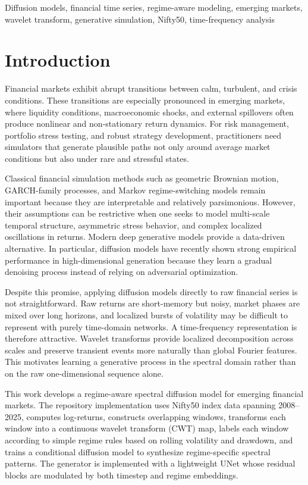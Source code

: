 \documentclass[conference]{IEEEtran}
\begin{document}
\begin{IEEEkeywords}
Diffusion models, financial time series, regime-aware modeling, emerging markets, wavelet transform, generative simulation, Nifty50, time-frequency analysis
\end{IEEEkeywords}

\section{Introduction}
Financial markets exhibit abrupt transitions between calm, turbulent, and crisis conditions. These transitions are especially pronounced in emerging markets, where liquidity conditions, macroeconomic shocks, and external spillovers often produce nonlinear and non-stationary return dynamics. For risk management, portfolio stress testing, and robust strategy development, practitioners need simulators that generate plausible paths not only around average market conditions but also under rare and stressful states.

Classical financial simulation methods such as geometric Brownian motion, GARCH-family processes, and Markov regime-switching models remain important because they are interpretable and relatively parsimonious. However, their assumptions can be restrictive when one seeks to model multi-scale temporal structure, asymmetric stress behavior, and complex localized oscillations in returns. Modern deep generative models provide a data-driven alternative. In particular, diffusion models have recently shown strong empirical performance in high-dimensional generation because they learn a gradual denoising process instead of relying on adversarial optimization.

Despite this promise, applying diffusion models directly to raw financial series is not straightforward. Raw returns are short-memory but noisy, market phases are mixed over long horizons, and localized bursts of volatility may be difficult to represent with purely time-domain networks. A time-frequency representation is therefore attractive. Wavelet transforms provide localized decomposition across scales and preserve transient events more naturally than global Fourier features. This motivates learning a generative process in the spectral domain rather than on the raw one-dimensional sequence alone.

This work develops a regime-aware spectral diffusion model for emerging financial markets. The repository implementation uses Nifty50 index data spanning 2008--2025, computes log-returns, constructs overlapping windows, transforms each window into a continuous wavelet transform (CWT) map, labels each window according to simple regime rules based on rolling volatility and drawdown, and trains a conditional diffusion model to synthesize regime-specific spectral patterns. The generator is implemented with a lightweight UNet whose residual blocks are modulated by both timestep and regime embeddings.
\end{document}
